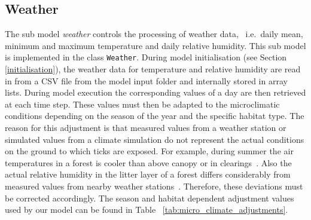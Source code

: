 \documentclass[a4paper, 11pt]{scrartcl}
\newcommand{\inlinecode}[1]{\texttt{\small #1}}
\begin{document}
\subsection{Weather}
The sub model \emph{weather} controls the processing of weather data, ~i.e.\ daily mean, minimum and maximum temperature and daily relative humidity. This sub model is implemented in the class \inlinecode{Weather}. During model initialisation (see Section \ref{initialisation}), the weather data for temperature and relative humidity are read in from a CSV file from the model input folder and internally stored in array lists. During model execution the corresponding values of a day are then retrieved at each time step. These values must then be adapted to the microclimatic conditions depending on the season of the year and the specific habitat type. The reason for this adjustment is that measured values from a weather station or simulated values from a climate simulation do not represent the actual conditions on the ground to which ticks are exposed. For example, during summer the air temperatures in a forest is cooler than above canopy or in clearings~\parencite{Bonan.2016, Geiger.1995}. Also the actual relative humidity in the litter layer of a forest differs considerably from measured values from nearby weather stations~\parencite{Boehnke.2017}. Therefore, these deviations must be corrected accordingly. The season and habitat dependent adjustment values used by our model can be found in Table ~\ref{tab:micro_climate_adjustments}.
\end{document}
